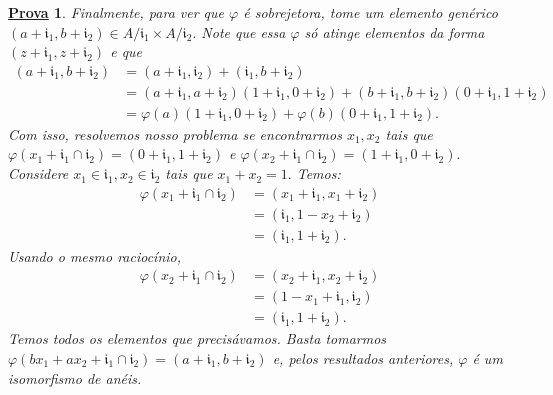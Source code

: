\documentclass{article}
\newtheorem*{proof*}{\underline{Prova}}
\begin{document}
\begin{proof*}
  Finalmente, para ver que \(\varphi \) é sobrejetora, tome um elemento genérico \((a+\mathfrak{i}_{1}, b+\mathfrak{i}_{2})\in A/\mathfrak{i}_{1}\times A/\mathfrak{i}_{2}.\)
  Note que essa \(\varphi \) só atinge elementos da forma \((z + \mathfrak{i}_{1}, z + \mathfrak{i}_{2})\) e que 
  \begin{align*}
    (a+\mathfrak{i}_{1}, b+\mathfrak{i}_{2}) &= (a+\mathfrak{i}_{1}, \mathfrak{i}_{2}) + (\mathfrak{i}_{1}, b + \mathfrak{i}_{2})\\
                                             &= (a+\mathfrak{i}_{1}, a + \mathfrak{i}_{2})(1+\mathfrak{i}_{1}, 0 + \mathfrak{i}_{2}) + (b+\mathfrak{i}_{1}, b+\mathfrak{i}_{2})(0+\mathfrak{i}_{1}, 1 + \mathfrak{i}_{2})\\
                                             &= \varphi(a)(1+\mathfrak{i}_{1}, 0 + \mathfrak{i}_{2}) + \varphi(b)(0+\mathfrak{i}_{1}, 1 + \mathfrak{i}_{2}).
  \end{align*}
  Com isso, resolvemos nosso problema se encontrarmos \(x_{1}, x_{2}\) tais que \(\varphi (x_{1}+\mathfrak{i}_{1}\cap \mathfrak{i}_{2}) = (0 +\mathfrak{i}_{1}, 1 +\mathfrak{i}_{2})\) e 
  \(\varphi (x_{2} + \mathfrak{i}_{1}\cap \mathfrak{i}_{2}) = (1+\mathfrak{i}_{1}, 0+\mathfrak{i}_{2}).\) Considere
  \(x_{1}\in \mathfrak{i}_{1}, x_{2}\in \mathfrak{i}_{2}\) tais que \(x_{1} + x_{2} = 1.\) Temos:
  \begin{align*}
    \varphi (x_{1}+\mathfrak{i}_{1}\cap \mathfrak{i}_{2}) &= (x_{1}+\mathfrak{i}_{1}, x_{1}+\mathfrak{i}_{2})\\
                                                          &= (\mathfrak{i}_{1}, 1 - x_{2} + \mathfrak{i}_{2})\\
                                                          &= (\mathfrak{i}_{1}, 1+\mathfrak{i}_{2}).
  \end{align*}
  Usando o mesmo raciocínio, 
  \begin{align*}
    \varphi (x_{2} + \mathfrak{i}_{1}\cap \mathfrak{i}_{2}) &= (x_{2}+\mathfrak{i}_{1}, x_{2}+\mathfrak{i}_{2})\\
                                                            &= (1-x_{1}+\mathfrak{i}_{1}, \mathfrak{i}_{2})\\
                                                            &= (\mathfrak{i}_{1}, 1 + \mathfrak{i}_{2}).
  \end{align*}
  Temos todos os elementos que precisávamos. Basta tomarmos \(\varphi (bx_{1} + ax_{2} + \mathfrak{i}_{1}\cap \mathfrak{i}_{2}) = (a+\mathfrak{i}_{1}, b+\mathfrak{i}_{2})\) e, pelos resultados anteriores,
  \(\varphi \) é um isomorfismo de anéis.


\end{proof*}
\end{document}
